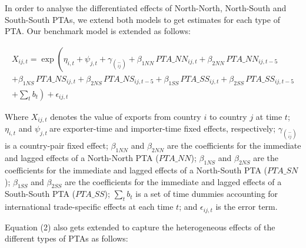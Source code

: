In order to analyse the differentiated effects of North-North,
North-South and South-South PTAs, we extend both models to get estimates
for each type of PTA. Our benchmark model is extended as follows:

\begin{multline}
    X_{ij,t} = \exp\left(\eta_{i,t} + \psi_{j,t} + \gamma_{\binom{-}{ij}} + \beta_{1NN} \, PTA\_NN_{ij,t} + \beta_{2NN} \, PTA\_NN_{ij,t-5} \right. \\
    + \beta_{1NS} \, PTA\_NS_{ij,t} + \beta_{2NS} \, PTA\_NS_{ij,t-5} + \beta_{1SS} \, PTA\_SS_{ij,t} + \beta_{2SS} \, PTA\_SS_{ij,t-5} \\
    + \left. \sum_{t} b_{t} \right) + \epsilon_{ij,t}
\end{multline}

Where \(X_{ij,t}\)\hspace{0pt} denotes the value of exports from country
\(i\) to country \(j\) at time \(t\); \(\eta_{i,t}\) and
\(\psi_{j,t}\ \)are exporter-time and importer-time fixed effects,
respectively; \(\gamma_{\binom{-}{ij}}\) is a country-pair fixed effect;
\hspace{0pt}\(\beta_{1NN}\) and \(\beta_{2NN}\) are the coefficients for
the immediate and lagged effects of a North-North PTA (\(PTA\_ NN\));
\hspace{0pt}\hspace{0pt}\(\beta_{1NS}\) and \(\beta_{2NS}\) are the
coefficients for the immediate and lagged effects of a North-South PTA
(\(PTA\_ SN\)); \hspace{0pt}\hspace{0pt}\(\beta_{1SS}\) and
\(\beta_{2SS}\) are the coefficients for the immediate and lagged
effects of a South-South PTA (\(PTA\_ SS\)); \(\sum_{t}^{}b_{t}\) is a
set of time dummies accounting for international trade-specific effects
at each time \(t\); and \(\epsilon_{ij,t}\) is the error term.

Equation (2) also gets extended to capture the heterogeneous effects of
the different types of PTAs as follows:

